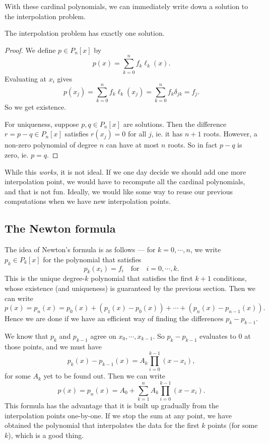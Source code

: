\documentclass[a4paper]{article}
\begin{document}
With these cardinal polynomials, we can immediately write down a solution to the interpolation problem.
\begin{thm}
  The interpolation problem has exactly one solution.
\end{thm}

\begin{proof}
  We define $p \in P_n[x]$ by
  \[
    p(x) = \sum_{k = 0}^n f_k \ell_k (x).
  \]
  Evaluating at $x_i$ gives
  \[
    p(x_j) = \sum_{k = 0}^n f_k \ell_k(x_j) = \sum_{k = 0}^n f_k \delta_{jk} = f_j.
  \]
  So we get existence.

  For uniqueness, suppose $p, q \in P_n[x]$ are solutions. Then the difference $r = p - q \in P_n[x]$ satisfies $r(x_j) = 0$ for all $j$, ie. it has $n + 1$ roots. However, a non-zero polynomial of degree $n$ can have at most $n$ roots. So in fact $p - q$ is zero, ie. $p = q$.
\end{proof}

While this \emph{works}, it is not ideal. If we one day decide we should add one more interpolation point, we would have to recompute all the cardinal polynomials, and that is not fun. Ideally, we would like some way to reuse our previous computations when we have new interpolation points.

\subsection{The Newton formula}
The idea of Newton's formula is as follows --- for $k = 0, \cdots, n$, we write $p_k \in P_k[x]$ for the polynomial that satisfies
\[
  p_k(x_i) = f_i\quad\text{for}\quad i = 0, \cdots, k.
\]
This is the unique degree-$k$ polynomial that satisfies the first $k + 1$ conditions, whose existence (and uniqueness) is guaranteed by the previous section. Then we can write
\[
  p(x) = p_n(x) = p_0(x) + (p_1(x) - p_0(x)) + \cdots + (p_n(x) - p_{n - 1}(x)).
\]
Hence we are done if we have an efficient way of finding the differences $p_k - p_{k - 1}$.

We know that $p_k$ and $p_{k - 1}$ agree on $x_0, \cdots, x_{k - 1}$. So $p_k - p_{k - 1}$ evaluates to $0$ at those points, and we must have
\[
  p_k(x) - p_{k - 1}(x) = A_k \prod_{i = 0}^{k - 1}(x - x_i),
\]
for some $A_k$ yet to be found out. Then we can write
\[
  p(x) = p_n(x) = A_0 + \sum_{k = 1}^n A_k \prod_{i = 0}^{k - 1} (x - x_i).
\]
This formula has the advantage that it is built up gradually from the interpolation points one-by-one. If we stop the sum at any point, we have obtained the polynomial that interpolates the data for the first $k$ points (for some $k$), which is a good thing.
\end{document}
